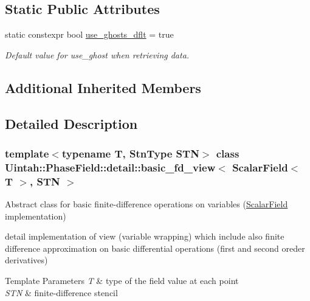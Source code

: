 \subsection*{Static Public Attributes}
\begin{DoxyCompactItemize}
\item 
static constexpr bool \hyperlink{classUintah_1_1PhaseField_1_1detail_1_1basic__fd__view_3_01ScalarField_3_01T_01_4_00_01STN_01_4_a2faa49acca4f2f6983d318ae64e3ed39}{use\+\_\+ghosts\+\_\+dflt} = true
\begin{DoxyCompactList}\small\item\em Default value for use\+\_\+ghost when retrieving data. \end{DoxyCompactList}\end{DoxyCompactItemize}
\subsection*{Additional Inherited Members}


\subsection{Detailed Description}
\subsubsection*{template$<$typename T, Stn\+Type S\+TN$>$\newline
class Uintah\+::\+Phase\+Field\+::detail\+::basic\+\_\+fd\+\_\+view$<$ Scalar\+Field$<$ T $>$, S\+T\+N $>$}

Abstract class for basic finite-\/difference operations on variables (\hyperlink{structUintah_1_1PhaseField_1_1ScalarField}{Scalar\+Field} implementation) 

detail implementation of view (variable wrapping) which include also finite difference approximation on basic differential operations (first and second oreder derivatives)


\begin{DoxyTemplParams}{Template Parameters}
{\em T} & type of the field value at each point \\
\hline
{\em S\+TN} & finite-\/difference stencil \\
\hline
\end{DoxyTemplParams}


